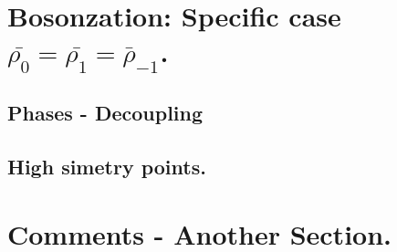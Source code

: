 \section{Bosonzation: Specific case$\bar{\rho_{0}} = \bar{\rho_{1}} = \bar{\rho}_{-1}$.}
\subsection{Phases - Decoupling}
\subsection{High simetry points.}

\section{Comments - Another Section.}






\newpage
 


